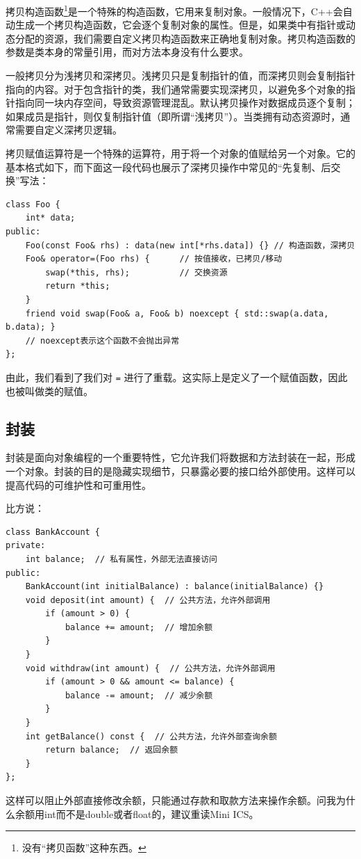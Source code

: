 拷贝构造函数\footnote{没有“拷贝函数”这种东西。}是一个特殊的构造函数，它用来复制对象。一般情况下，C++会自动生成一个拷贝构造函数，它会逐个复制对象的属性。但是，如果类中有指针或动态分配的资源，我们需要自定义拷贝构造函数来正确地复制对象。拷贝构造函数的参数是类本身的常量引用，而对方法本身没有什么要求。

一般拷贝分为浅拷贝和深拷贝。浅拷贝只是复制指针的值，而深拷贝则会复制指针指向的内容。对于包含指针的类，我们通常需要实现深拷贝，以避免多个对象的指针指向同一块内存空间，导致资源管理混乱。默认拷贝操作对数据成员逐个复制；如果成员是指针，则仅复制指针值（即所谓“浅拷贝”）。当类拥有动态资源时，通常需要自定义深拷贝逻辑。

拷贝赋值运算符是一个特殊的运算符，用于将一个对象的值赋给另一个对象。它的基本格式如下，而下面这一段代码也展示了深拷贝操作中常见的“先复制、后交换”写法：
\begin{verbatim}
class Foo {
    int* data;
public:
    Foo(const Foo& rhs) : data(new int[*rhs.data]) {} // 构造函数，深拷贝
    Foo& operator=(Foo rhs) {      // 按值接收，已拷贝/移动
        swap(*this, rhs);          // 交换资源
        return *this;
    }
    friend void swap(Foo& a, Foo& b) noexcept { std::swap(a.data, b.data); }
    // noexcept表示这个函数不会抛出异常
};
\end{verbatim}
由此，我们看到了我们对 \texttt{=} 进行了重载。这实际上是定义了一个赋值函数，因此也被叫做类的赋值。

\subsection{封装}

封装是面向对象编程的一个重要特性，它允许我们将数据和方法封装在一起，形成一个对象。封装的目的是隐藏实现细节，只暴露必要的接口给外部使用。这样可以提高代码的可维护性和可重用性。

比方说：
\begin{verbatim}
class BankAccount {
private:
    int balance;  // 私有属性，外部无法直接访问
public:
    BankAccount(int initialBalance) : balance(initialBalance) {}
    void deposit(int amount) {  // 公共方法，允许外部调用
        if (amount > 0) {
            balance += amount;  // 增加余额
        }
    }
    void withdraw(int amount) {  // 公共方法，允许外部调用
        if (amount > 0 && amount <= balance) {
            balance -= amount;  // 减少余额
        }
    }
    int getBalance() const {  // 公共方法，允许外部查询余额
        return balance;  // 返回余额
    }
};
\end{verbatim}
这样可以阻止外部直接修改余额，只能通过存款和取款方法来操作余额。问我为什么余额用int而不是double或者float的，建议重读Mini ICS。

